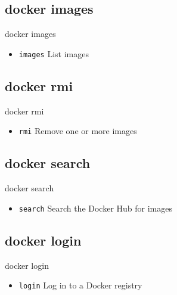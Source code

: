 \subsection{docker images}\label{subsec:docker-images}
\begin{frame}{docker images}
    \begin{itemize}
        \item \texttt{images} List images
        \pause
        
    \end{itemize}
\end{frame}

\subsection{docker rmi}\label{subsec:docker-rmi}
\begin{frame}{docker rmi}
    \begin{itemize}
        \item \texttt{rmi} Remove one or more images
        \pause
        
    \end{itemize}
\end{frame}

\subsection{docker search}\label{subsec:docker-search}
\begin{frame}{docker search}
    \begin{itemize}
        \item \texttt{search} Search the Docker Hub for images
        \pause
        
    \end{itemize}
\end{frame}

\subsection{docker login}\label{subsec:docker-login}
\begin{frame}{docker login}
    \begin{itemize}
        \item \texttt{login} Log in to a Docker registry
        \pause
        
    \end{itemize}
\end{frame}


